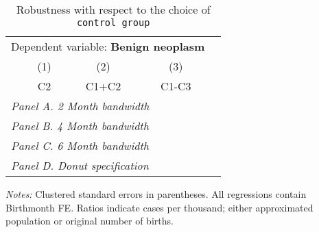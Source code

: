  \begin{table}[H] \begin{threeparttable} \centering \caption{Robustness with respect to the choice of \texttt{control group}} {\def\sym#1{\ifmmode^{#1}\else\(^{#1}\)\fi} \begin{tabular}{l*{4}{c}} \toprule \multicolumn{4}{c}{Dependent variable: \textbf{Benign neoplasm}} \\ \cmidrule(lr){2-4}
            &\multicolumn{1}{c}{(1)}&\multicolumn{1}{c}{(2)}&\multicolumn{1}{c}{(3)}\\
            &\multicolumn{1}{c}{C2}&\multicolumn{1}{c}{C1+C2}&\multicolumn{1}{c}{C1-C3}\\
\midrule
 \multicolumn{4}{l}{\emph{Panel A. 2 Month bandwidth}} \\    \midrule\multicolumn{4}{l}{\emph{Panel B. 4 Month bandwidth}} \\    \midrule\multicolumn{4}{l}{\emph{Panel C. 6 Month bandwidth}} \\    \midrule\multicolumn{4}{l}{\emph{Panel D. Donut specification}} \\    
\bottomrule \end{tabular} } \begin{tablenotes} \item \scriptsize \emph{Notes:} Clustered standard errors in parentheses. All regressions contain Birthmonth FE. Ratios indicate cases per thousand; either approximated population or original number of births. \end{tablenotes} \end{threeparttable} \end{table} 
